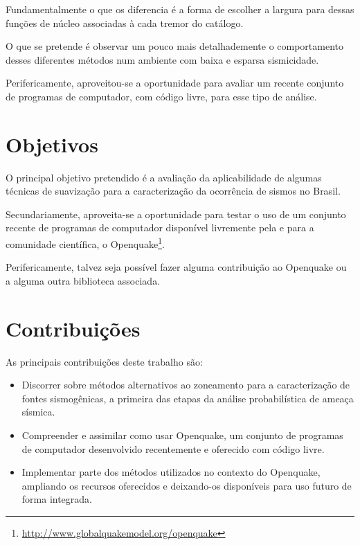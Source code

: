 Fundamentalmente o que os diferencia é a forma de escolher a largura para dessas
funções de núcleo associadas à cada tremor do catálogo.

O que se pretende é observar um pouco mais detalhademente o comportamento
desses diferentes métodos num ambiente com baixa e esparsa sismicidade.

Perifericamente, aproveitou-se a oportunidade para avaliar um recente
conjunto de programas de computador, com código livre, para esse tipo de análise.
 

\section{Objetivos}
\label{sec:objetivo}

O principal objetivo pretendido é a avaliação da
aplicabilidade de algumas técnicas de suavização para a
caracterização da ocorrência de sismos no Brasil.

Secundariamente, aproveita-se a oportunidade para testar o uso de um conjunto
recente de programas de computador disponível livremente pela e para a comunidade
científica, o Openquake\footnote{\url{http://www.globalquakemodel.org/openquake}}. 

Perifericamente, talvez seja possível fazer alguma contribuição ao Openquake
ou a alguma outra biblioteca associada.

\section{Contribuições}
\label{sec:contribucoes}

As principais contribuições deste trabalho são:

\begin{itemize}
  \item Discorrer sobre métodos alternativos ao zoneamento para a caracterização de fontes
  sismogênicas, a primeira das etapas da análise probabilística de ameaça 
  sísmica.

  \item Compreender e assimilar como usar Openquake, um conjunto de programas de
  computador desenvolvido recentemente e oferecido com código livre. 
  
  \item Implementar parte dos métodos utilizados no contexto do
  Openquake, ampliando os recursos oferecidos e deixando-os disponíveis
  para uso futuro de forma integrada.

\end{itemize}

